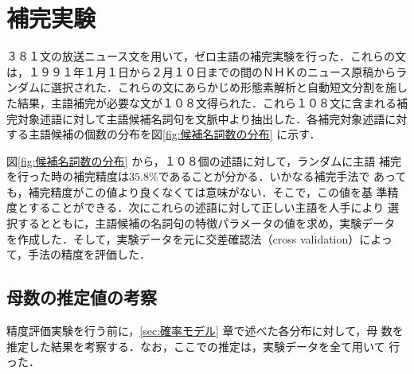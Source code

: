 \section{補完実験} \label{sec:補完実験}
３８１文の放送ニュース文を用いて，ゼロ主語の補完実験を行った．これらの文
は，１９９１年１月１日から２月１０日までの間のＮＨＫのニュース原稿からラ
ンダムに選択された．これらの文にあらかじめ形態素解析と自動短文分割を施し
た結果，主語補完が必要な文が１０８文得られた．これら１０８文に含まれる補
完対象述語に対して主語候補名詞句を文脈中より抽出した．各補完対象述語に対
する主語候補の個数の分布を図\ref{fig:候補名詞数の分布} に示す．

\begin{figure}
\end{figure}
図\ref{fig:候補名詞数の分布} から，１０８個の述語に対して，ランダムに主語
補完を行った時の補完精度は$35.8$\%であることが分かる．いかなる補完手法で
あっても，補完精度がこの値より良くなくては意味がない．そこで，この値を基
準精度とすることができる．次にこれらの述語に対して正しい主語を人手により
選択するとともに，主語候補の名詞句の特徴パラメータの値を求め，実験データ
を作成した．そして，実験データを元に交差確認法（cross validation）によっ
て，手法の精度を評価した．

\subsection{母数の推定値の考察}
精度評価実験を行う前に，\ref{sec:確率モデル} 章で述べた各分布に対して，母
数を推定した結果を考察する．なお，ここでの推定は，実験データを全て用いて
行った．

